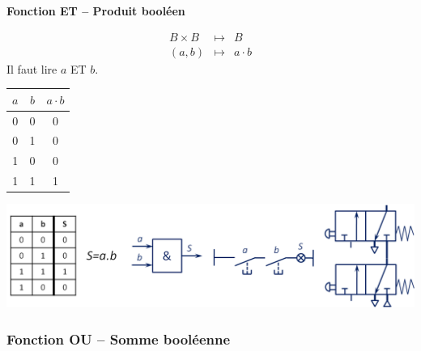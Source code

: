 \begin{defi}
\textbf{Fonction ET -- Produit booléen}

\begin{minipage}[c]{.45\linewidth}
\begin{eqnarray*}
B \times B &\longmapsto& B\\
(a,b) &\longmapsto& a \cdot b
\end{eqnarray*}
Il faut lire $a$ ET $b$. 
\end{minipage} \hfill
\begin{minipage}[c]{.45\linewidth}
\begin{center}
\begin{tabular}{|c|c||c|}
\hline
$a$ & $b$ & $a\cdot b$ \\
\hline
0 & 0 & 0 \\ \hline
0 & 1 & 0 \\ \hline
1 & 0 & 0 \\ \hline
1 & 1 & 1 \\ \hline
\end{tabular}
\end{center}
\end{minipage}
\end{defi}

\begin{exemple}

\begin{center}
\includegraphics[width=.9\textwidth]{images/ET}
\end{center}

\end{exemple}


\subsubsection{Fonction OU -- Somme booléenne}


